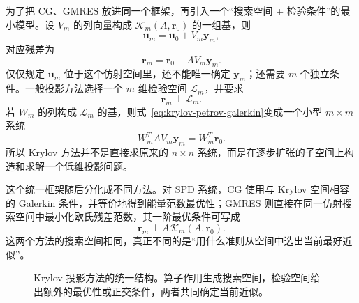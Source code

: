 为了把 CG、GMRES 放进同一个框架，再引入一个“搜索空间 + 检验条件”的最小模型。设 $V_m$ 的列向量构成 $\mathcal K_m(A,\bm r_0)$ 的一组基，则
\begin{equation}
\bm u_m
=
\bm u_0+V_m\bm y_m,
\label{eq:krylov-basis-correction}
\end{equation}
对应残差为
\begin{equation}
\bm r_m
=
\bm r_0-AV_m\bm y_m.
\label{eq:krylov-residual-in-basis}
\end{equation}
仅仅规定 $\bm u_m$ 位于这个仿射空间里，还不能唯一确定 $\bm y_m$；还需要 $m$ 个独立条件。一般投影方法选择一个 $m$ 维检验空间 $\mathcal L_m$，并要求
\begin{equation}
\boxed{
\bm r_m\perp\mathcal L_m.
}
\label{eq:krylov-petrov-galerkin}
\end{equation}
若 $W_m$ 的列构成 $\mathcal L_m$ 的基，则式~\eqref{eq:krylov-petrov-galerkin}变成一个小型 $m\times m$ 系统
\begin{equation}
\boxed{
W_m^TAV_m\bm y_m
=
W_m^T\bm r_0.
}
\label{eq:krylov-projected-small-system}
\end{equation}
所以 Krylov 方法并不是直接求原来的 $n\times n$ 系统，而是在逐步扩张的子空间上构造和求解一个低维投影问题\cite{saad2003}。

这个统一框架随后分化成不同方法。对 SPD 系统，CG 使用与 Krylov 空间相容的 Galerkin 条件，并等价地得到能量范数最优性；GMRES 则直接在同一仿射搜索空间中最小化欧氏残差范数，其一阶最优条件可写成
\begin{equation}
\bm r_m\perp A\mathcal K_m(A,\bm r_0).
\label{eq:gmres-residual-orthogonality-preview}
\end{equation}
这两个方法的搜索空间相同，真正不同的是“用什么准则从空间中选出当前最好近似”。

\begin{figure}[htbp]
\centering
{}
\caption{Krylov 投影方法的统一结构。算子作用生成搜索空间，检验空间给出额外的最优性或正交条件，两者共同确定当前近似。}
\label{fig:krylov-projection-framework}
\end{figure}

